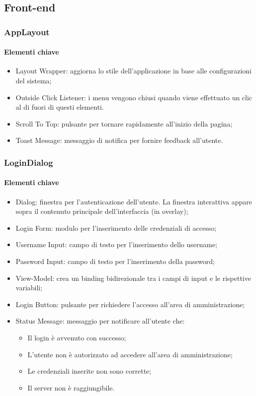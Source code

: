 \subsection{Front-end}

\subsubsection{AppLayout}

\paragraph*{Elementi chiave}
\begin{itemize}
  \item Layout Wrapper: aggiorna lo stile dell'applicazione in base alle configurazioni del sistema;
  \item Outside Click Listener: i menu vengono chiusi quando viene effettuato un clic al di fuori di questi elementi.
  \item Scroll To Top: pulsante per tornare rapidamente all'inizio della pagina;
  \item Toast Message: messaggio di notifica per fornire feedback all'utente.
\end{itemize}

\subsubsection{LoginDialog}

\paragraph*{Elementi chiave}
\begin{itemize}
  \item Dialog: finestra per l'autenticazione dell'utente. La finestra interattiva appare sopra il contenuto principale dell'interfaccia (in overlay);
  \item Login Form: modulo per l'inserimento delle credenziali di accesso;
  \item Username Input: campo di testo per l'inserimento dello username;
  \item Password Input: campo di testo per l'inserimento della password;
  \item View-Model: crea un binding bidirezionale tra i campi di input e le rispettive variabili;
  \item Login Button: pulsante per richiedere l'accesso all'area di amministrazione;
  \item Status Message: messaggio per notificare all'utente che:
  \begin{itemize}
    \item Il login è avvenuto con successo;
    \item L'utente non è autorizzato ad accedere all'area di amministrazione;
    \item Le credenziali inserite non sono corrette;
    \item Il server non è raggiungibile.
  \end{itemize}
\end{itemize}

